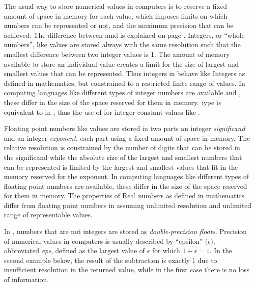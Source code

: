 \documentclass[krantz2]{krantz}\usepackage{knitr}
\begin{document}
\begin{explainbox}
\label{box:floats} \label{par:float}
%
The usual way to store numerical values in computers is to reserve a fixed amount of space in memory for each value, which imposes limits on which numbers can be represented or not, and the maximum precision that can be achieved. The difference between  amd  is explained on page \pageref{box:integer:float}. Integers, or ``whole numbers'', like \Rlang {} values are stored always with the same resolution such that the smallest difference between two integer values is 1. The amount of memory available to store an individual value creates a limit for the size of largest and smallest values that can be represented. Thus integers in \Rlang behave like Integers as defined in mathematics, but constrained to a restricted finite range of values. In computing languages like \Clang different types of integer numbers are available  and , these differ in the size of the space reserved for them in memory. \Rlang {} type is equivalent to  in \Clang, thus the use of  for integer constant values like .

Floating point numbers like \Rlang {} values are stored in two parts an integer \emph{significand} and an integer \emph{exponent}, each part using a fixed amount of space in memory. The relative resolution is constrained by the number of digits that can be stored in the significand while the absolute size of the largest and smallest numbers that can be represented is limited by the largest and smallest values that fit in the memory reserved for the exponent. In computing languages like \Clang different types of floating point numbers are available, these differ in the size of the space reserved for them in memory. The properties of Real numbers as defined in mathematics differ from floating point numbers in assuming unlimited resolution and unlimited range of representable values.

In \Rpgrm, numbers that are not integers are stored as \emph{double-precision floats}. Precision of numerical values in computers is usually described by ``epsilon'' ($\epsilon$), abbreviated \emph{eps}, defined as the largest value of $\epsilon$ for which $1 + \epsilon = 1$. In the second example below, the result of the subtraction is exactly 1 due to insufficient resolution in the returned value, while in the first case there is no loss of information.


\end{explainbox}
\end{document}
